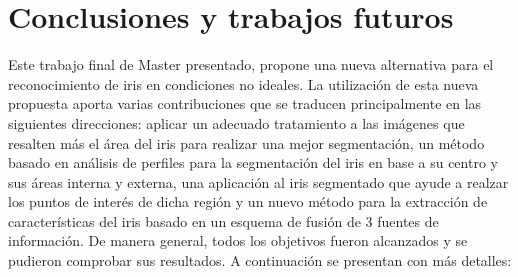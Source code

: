 
\chapter{Conclusiones y trabajos futuros} %

\label{Capítulo 6} %









Este trabajo final de Master presentado, propone una nueva alternativa para el reconocimiento de iris en condiciones no ideales. La utilización de esta nueva propuesta aporta varias contribuciones que se traducen principalmente en las siguientes direcciones: aplicar un adecuado tratamiento a las imágenes que resalten más el área del iris para realizar una mejor segmentación, un método basado en análisis de perfiles para la segmentación del iris en base a su centro y sus áreas interna y externa, una aplicación al iris segmentado que ayude a realzar los puntos de interés de dicha región y un nuevo método para la extracción de características del iris basado en un esquema de fusión de 3 fuentes de información. De manera general, todos los objetivos fueron alcanzados y se pudieron comprobar sus resultados. A continuación se presentan con más detalles:

